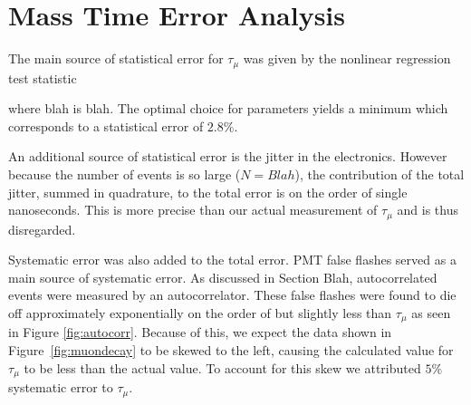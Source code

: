 
\section{Mass Time Error Analysis}

The main source of statistical error for $\tau_{\mu}$ was given by the nonlinear regression test statistic

where blah is blah.  The optimal choice for parameters yields a minimum which corresponds to a statistical error of $2.8\%$.  

An additional source of statistical error is the jitter in the electronics.  However because the number of events is so large ($N=Blah$), the contribution of the total jitter, summed in quadrature, to the total error is on the order of single nanoseconds.  This is more precise than our actual measurement of $\tau_{\mu}$ and is thus disregarded. 
 
Systematic error was also added to the total error.  PMT false flashes served as a main source of systematic error.  As discussed in Section Blah, autocorrelated events were measured by an autocorrelator. These false flashes were found to die off approximately exponentially on the order of but slightly less than $\tau_{\mu}$ as seen in Figure \ref{fig:autocorr}.  Because of this, we expect the data shown in Figure~\ref{fig:muondecay} to be skewed to the left, causing the calculated value for $\tau_{\mu}$ to be less than the actual value.  To account for this skew we attributed $5\%$ systematic error to $\tau_{\mu}$.

